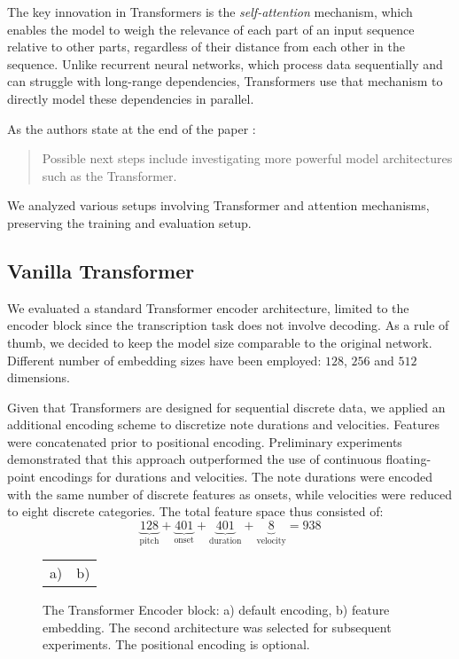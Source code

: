The key innovation in Transformers is the \emph{self-attention} mechanism, which enables the model to weigh the relevance of each part of an input sequence relative to other parts, regardless of their distance from each other in the sequence. Unlike recurrent neural networks, which process data sequentially and can struggle with long-range dependencies, Transformers use that mechanism to directly model these dependencies in parallel.

As the authors state at the end of the paper \cite{Liu2022}: \begin{quote}Possible next steps include investigating more powerful model architectures such as the Transformer.\end{quote} We analyzed various setups involving Transformer and attention mechanisms, preserving the training and evaluation setup.

\subsection{Vanilla Transformer}

We evaluated a standard Transformer encoder architecture, limited to the encoder block since the transcription task does not involve decoding. As a rule of thumb, we decided to keep the model size comparable to the original network. Different number of embedding sizes have been employed: $128$, $256$ and $512$ dimensions. 

Given that Transformers are designed for sequential discrete data, we applied an additional encoding scheme to discretize note durations and velocities. Features were concatenated prior to positional encoding. Preliminary experiments demonstrated that this approach outperformed the use of continuous floating-point encodings for durations and velocities. The note durations were encoded with the same number of discrete features as onsets, while velocities were reduced to eight discrete categories. The total feature space thus consisted of: \[\underbrace{128}_{\textrm{pitch}}+\underbrace{401}_{\textrm{onset}}+\underbrace{401}_{\textrm{duration}}+\underbrace{8}_{\textrm{velocity}} = 938\]

\begin{figure}[ht!]
\centering
\begin{tabular}{cc}a)
 & b)

\end{tabular}
\caption[The Transformer Encoder block.]{The Transformer Encoder block: a) default encoding, b) feature embedding. The second architecture was selected for subsequent experiments. The positional encoding is optional.}
\label{vanilla_transformer_encoder_with_embedding}
\end{figure}

